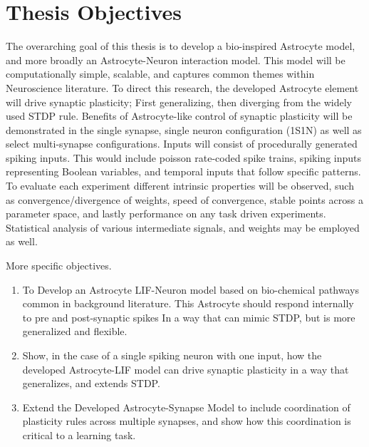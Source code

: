 \section{Thesis Objectives}

The overarching goal of this thesis is to develop a bio-inspired Astrocyte
model, and more broadly an Astrocyte-Neuron interaction model. This model will
be computationally simple, scalable, and captures common themes within
Neuroscience literature. To direct this research, the developed Astrocyte
element will drive synaptic plasticity; First generalizing, then diverging from
the widely used STDP rule. Benefits of Astrocyte-like control of synaptic
plasticity will be demonstrated in the single synapse, single neuron
configuration (1S1N) as well as select multi-synapse configurations. Inputs will
consist of procedurally generated spiking inputs. This would include poisson
rate-coded spike trains, spiking inputs representing Boolean variables, and
temporal inputs that follow specific patterns. To evaluate each experiment
different intrinsic properties will be observed, such as convergence/divergence
of weights, speed of convergence, stable points across a parameter space, and
lastly performance on any task driven experiments. Statistical analysis of
various intermediate signals, and weights may be employed as well.

More specific objectives.
\begin{enumerate}
\item To Develop an Astrocyte LIF-Neuron model based on bio-chemical pathways
  common in background literature. This Astrocyte should respond internally to
  pre and post-synaptic spikes In a way that can mimic STDP, but is more
  generalized and flexible.

  \item Show, in the case of a single spiking neuron with one input, how the
    developed Astrocyte-LIF model can drive synaptic plasticity in a way that
    generalizes, and extends STDP.

  \item Extend the Developed Astrocyte-Synapse Model to include coordination of
    plasticity rules across multiple synapses, and show how this coordination is
    critical to a learning task.

\end{enumerate}

